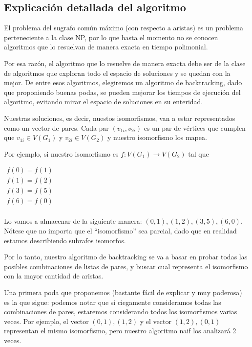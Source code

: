 \subsection{Explicación detallada del algoritmo}

El problema del sugrafo común máximo (con respecto a aristas) es un problema perteneciente a la clase NP, por lo que hasta el momento no se conocen algoritmos que lo resuelvan de manera exacta en tiempo polimonial. 

Por esa razón, el algoritmo que lo resuelve de manera exacta debe ser de la clase de algoritmos que exploran todo el espacio de soluciones y se quedan con la mejor. De entre esos algoritmos, elegiremos un algoritmo de backtracking, dado que proponiendo buenas podas, se pueden mejorar los tiempos de ejecución del algoritmo, evitando mirar el espacio de soluciones en su enteridad.

Nuestras soluciones, es decir, nuestos isomorfismos, van a estar representados como un vector de pares. Cada par $(v_{1i}, v_{2i})$ es un par de vértices que cumplen que $v_{1i} \in V(G_1)$ y $v_{2i} \in V(G_2)$ y nuestro isomorfismo los mapea. 

Por ejemplo, si nuestro isomorfismo es $f : V(G_1) \to V(G_2)$ tal que

$
\begin{matrix}
f(0) = f(1) \\
f(1) = f(2) \\
f(3) = f(5) \\
f(6) = f(0) \\
\end{matrix}
$

Lo vamos a almacenar de la siguiente manera: ${(0,1), (1,2), (3,5), (6,0)}$. Nótese que no importa que el ``isomorfismo'' sea parcial, dado que en realidad estamos describiendo subrafos isomorfos.

Por lo tanto, nuestro algoritmo de backtracking se va a basar en probar todas las posibles combinaciones de listas de pares, y buscar cual representa el isomorfismo con la mayor cantidad de aristas. 

Una primera poda que proponemos (bastante fácil de explicar y muy poderosa) es la que sigue: podemos notar que si ciegamente consideramos todas las combinaciones de pares, estaremos considerando todos los isomorfismos varias veces.
Por ejemplo, el vector ${(0,1), (1,2)}$ y el vector ${(1,2), (0,1)}$ representan el mismo isomorfismo, pero nuestro algoritmo naif los analizará 2 veces.

